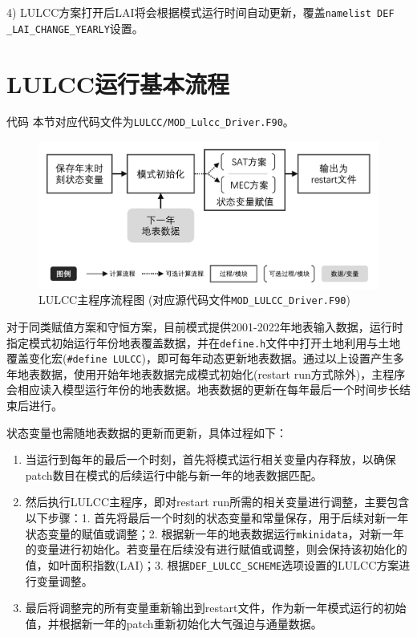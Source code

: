 4) LULCC方案打开后LAI将会根据模式运行时间自动更新，覆盖\texttt{namelist DEF\- \_LAI\_CHANGE\_YEARLY}设置。


\section{LULCC运行基本流程}
\begin{mymdframed}{代码}
  本节对应代码文件为\texttt{LULCC/MOD\_Lulcc\_Driver.F90}。
\end{mymdframed}

{
  \begin{figure}[htbp]
    \centering
    \includegraphics[width=0.85\columnwidth]{Figures/土地利用与土地覆盖变化模拟/LULCCDRIVER流程图_v2.png}
    \caption[LULCC主程序流程图]{LULCC主程序流程图 (对应源代码文件\texttt{MOD\_LULCC\_Driver.F90})}
    \label{fig:LULCC主程序流程图}
  \end{figure}
}

对于同类赋值方案和守恒方案，目前模式提供2001-2022年地表输入数据，运行时指定模式初始运行年份地表覆盖数据，并在\texttt{define.h}文件中打开土地利用与土地覆盖变化宏(\texttt{\#define LULCC})，即可每年动态更新地表数据。通过以上设置产生多年地表数据，使用开始年地表数据完成模式初始化(restart run方式除外)，主程序会相应读入模型运行年份的地表数据。地表数据的更新在每年最后一个时间步长结束后进行。

状态变量也需随地表数据的更新而更新，具体过程如下：

\begin{enumerate}
  \item 当运行到每年的最后一个时刻，首先将模式运行相关变量内存释放，以确保patch数目在模式的后续运行中能与新一年的地表数据匹配。

  \item 然后执行LULCC主程序，即对restart run所需的相关变量进行调整，主要包含以下步骤：1. 首先将最后一个时刻的状态变量和常量保存，用于后续对新一年状态变量的赋值或调整；2. 根据新一年的地表数据运行\texttt{mkinidata}，对新一年的变量进行初始化。若变量在后续没有进行赋值或调整，则会保持该初始化的值，如叶面积指数(LAI)；3. 根据\texttt{DEF\_LULCC\_SCHEME}选项设置的LULCC方案进行变量调整。

  \item 最后将调整完的所有变量重新输出到restart文件，作为新一年模式运行的初始值，并根据新一年的patch重新初始化大气强迫与通量数据。
\end{enumerate}

